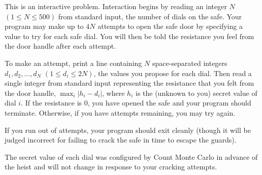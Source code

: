 
This is an interactive problem.
Interaction begins by reading an integer $N$ $(1 \leq N \leq 500)$ from standard input, the number of dials on the safe.
Your program may make up to $4N$ attempts to open the safe door by specifying a value to try for each safe dial. You will then be told the resistance you feel from the door handle after each attempt.

To make an attempt, print a line containing $N$ space-separated integers $d_1, d_2, \ldots, d_N$ $(1 \leq d_i \leq 2N)$, the values you propose for each dial. Then read a single integer from standard input representing the resistance that you felt from the door handle, $\max_i |h_i - d_i|$, where $h_i$ is the (unknown to you) secret value of dial $i$. If the resistance is $0$, you have opened the safe and your program should terminate. Otherwise, if you have attempts remaining, you may try again.

If you run out of attempts, your program should exit cleanly (though it will be judged incorrect for failing to crack the safe in time to escape the guards).

The secret value of each dial was configured by Count Monte Carlo in advance of the heist and will not change in response to your cracking attempts.

